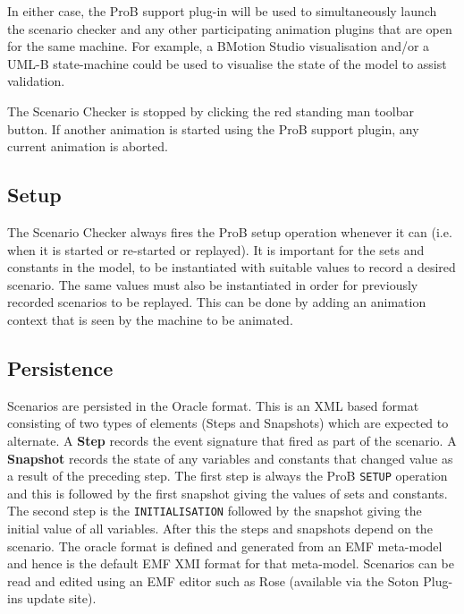 In either case, the ProB support plug-in will be used to simultaneously launch the scenario checker and any other participating animation plugins that are open for  the same machine.
For example, a BMotion Studio visualisation and/or a UML-B state-machine could be used to visualise the state of the model to assist validation.

The Scenario Checker is stopped by clicking the red standing man toolbar button. If another animation is started using the ProB support plugin, any current animation is aborted.

\subsection{Setup}
\label{sec:setup}

The Scenario Checker always fires the ProB setup operation whenever it can (i.e. when it is started or re-started or replayed).
It is important for the sets and constants in the model, to be instantiated with suitable values to record a desired scenario.
The same values must also be instantiated in order for previously recorded scenarios to be replayed.
This can be done by adding an animation context that is seen by the machine to be animated.

\subsection{Persistence}
\label{sec:persistence}

Scenarios are persisted in the Oracle format.
This is an XML based format consisting of two types of elements (Steps and Snapshots) which are expected to alternate.
A \textbf{Step} records the event signature that fired as part of the scenario.
A \textbf{Snapshot} records the state of any variables and constants that changed value as a result of the preceding step.
The first step is always the ProB \texttt{SETUP} operation and this is followed by the first snapshot giving the values of sets and constants.
The second step is the \texttt{INITIALISATION} followed by the snapshot giving the initial value of all variables.
After this the steps and snapshots depend on the scenario.
The oracle format is defined and generated from an EMF meta-model and hence is the default EMF XMI format for that meta-model.
Scenarios can be read and edited using an EMF editor such as Rose (available via the Soton Plug-ins update site).


